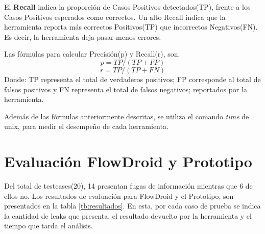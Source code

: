 El \textbf{Recall} indica la proporción de Casos Positivos detectados(TP),
frente a los Casos Positivos esperados como correctos\cite{Precision-Recall}. Un
alto Recall indica que la herramienta reporta más correctos Positivos(TP) que incorrectos
Negativos(FN). Es decir, la herramienta deja pasar menos errores.\newline
% 

Las fórmulas para calcular Precisión(p) y Recall(r), son:
\begin{equation}
\label{pre}
	p = TP/(TP +FP) 
\end{equation}
\begin{equation}
\label{rec}
	r = TP/(TP+FN)
\end{equation}
Donde: \newline
TP representa el total de verdaderos positivos; FP corresponde al total de
falsos positivos y  FN representa el total de falsos
negativos; reportados por la herramienta.

Además de las fórmulas anteriormente descritas, se utiliza el comando
\textit{time}\cite{time-man} de unix, para medir el desempeño de cada
herramienta.

\section{Evaluación FlowDroid y Prototipo } 
\label{subsec:fvsp}
Del total de testcases(20), 14 presentan fugas de información mientras que 6 de
ellos no. Los resultados de evaluación para FlowDroid y el Prototipo, son
presentados en la tabla \ref{tb:resultados}. En esta, por cada caso de prueba
se indica la cantidad de leaks que presenta, el resultado devuelto por la
herramienta y el tiempo que tarda el análisis.

